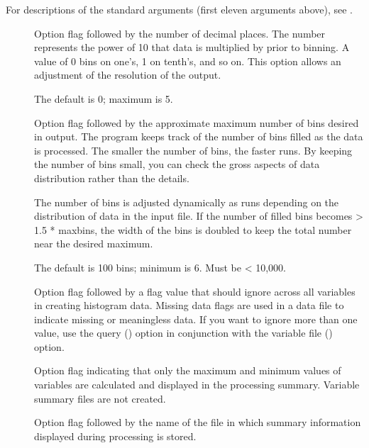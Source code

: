 For descriptions of the standard arguments (first eleven arguments
above), see .

\begin{description}

\item[\dashp]
  
  Option flag followed by the number of decimal places. The number
  represents the power of 10 that data is multiplied by prior to
  binning. A value of 0 bins on one's, 1 on tenth's, and so on. This
  option allows an adjustment of the resolution of the 
  output.
  
  The default is 0; maximum is 5.
  

\item[\dashm]
  
  Option flag followed by the approximate maximum number of bins
  desired in  output. The  program keeps
  track of the number of bins filled as the data is processed. The
  smaller the number of bins, the faster  runs. By
  keeping the number of bins small, you can check the gross aspects of
  data distribution rather than the details.
  
  The number of bins is adjusted dynamically as  runs
  depending on the distribution of data in the input file. If the
  number of filled bins becomes > 1.5 * maxbins, the width of the bins
  is doubled to keep the total number near the desired maximum.
  
  The default is 100 bins; minimum is 6. Must be < 10,000.
  


\item[\dashmd]
  
  Option flag followed by a flag value that  should
  ignore across all variables in creating histogram data. Missing data
  flags are used in a data file to indicate missing or meaningless
  data. If you want  to ignore more than one value, use
  the query () option in conjunction with the variable file
  () option.

\item[\dashmm]
  
  Option flag indicating that only the maximum and minimum values of
  variables are calculated and displayed in the processing summary.
  Variable summary files are not created.

\item[\dasho]
  
  Option flag followed by the name of the file in which summary
  information displayed during processing is stored.

\end{description}


